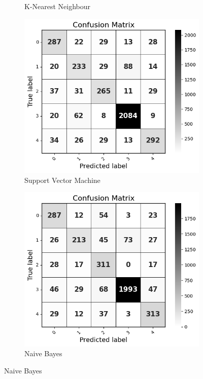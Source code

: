 \begin{figure}[H]
\begin{subfigure}[b]{0.49\textwidth}
        \vspace{-0.8cm}
        \caption{K-Nearest Neighbour}
        \label{LSTMROC4}  %
    \end{subfigure}
    \hfill
    \begin{subfigure}[b]{0.49\textwidth}
        \centering
        \includegraphics[width=\textwidth]{Images/HP SVM CM.png}
        \vspace{-0.8cm}
        \caption{Support Vector Machine}
        \label{LSTMROC6}  %
    \end{subfigure}
    \hfill
    \begin{subfigure}[b]{0.49\textwidth}
        \centering
        \includegraphics[width=\textwidth]{Images/HP NB CM.png}
        \vspace{-0.8cm}
        \caption{Naive Bayes}
        \label{LSTMROC7}  %
        

\end{subfigure}
\end{figure}
